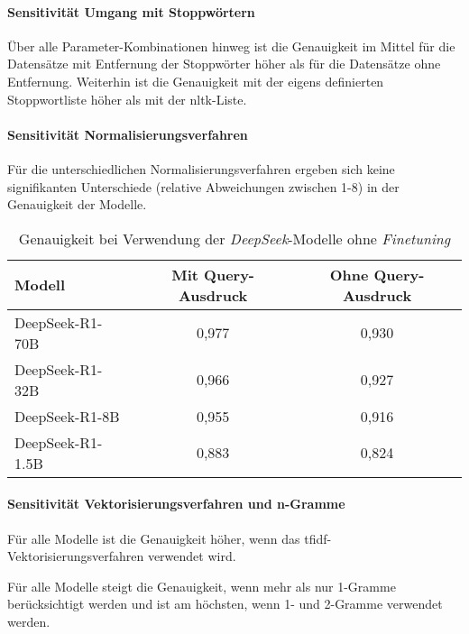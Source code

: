\paragraph{Sensitivität Umgang mit Stoppwörtern}

Über alle Parameter-Kombinationen hinweg ist die Genauigkeit im Mittel für die Datensätze mit Entfernung der Stoppwörter höher als für die Datensätze ohne Entfernung.
Weiterhin ist die Genauigkeit mit der eigens definierten Stoppwortliste höher als mit der \gls{nltk}-Liste.

\paragraph{Sensitivität Normalisierungsverfahren}

Für die unterschiedlichen Normalisierungsverfahren ergeben sich keine signifikanten Unterschiede (relative Abweichungen zwischen 1-8\textperthousand) in der Genauigkeit der Modelle.

\begin{table}
    \center
    \begin{tabular}{lcc}
        \toprule
        Modell           & Mit Query-Ausdruck & Ohne Query-Ausdruck \\
        \midrule
        DeepSeek-R1-70B  & 0,977                           &  0,930                         \\
        DeepSeek-R1-32B  & 0,966                           &  0,927                         \\
        DeepSeek-R1-8B   & 0,955                           &  0,916                         \\
        DeepSeek-R1-1.5B & 0,883                           &  0,824                         \\
        \bottomrule
    \end{tabular}
    \caption{Genauigkeit bei Verwendung der \textit{DeepSeek}-Modelle ohne \textit{Finetuning}}
    \label{tab:deepseek-results}
\end{table}

\paragraph{Sensitivität Vektorisierungsverfahren und n-Gramme}

Für alle Modelle ist die Ge\-nauig\-keit höher, wenn das \gls{tfidf}-Vektorisierungsverfahren verwendet wird.

Für alle Modelle steigt die Genauigkeit, wenn mehr als nur 1-Gramme berücksichtigt werden und ist am höchsten, wenn 1- und 2-Gramme verwendet werden.

